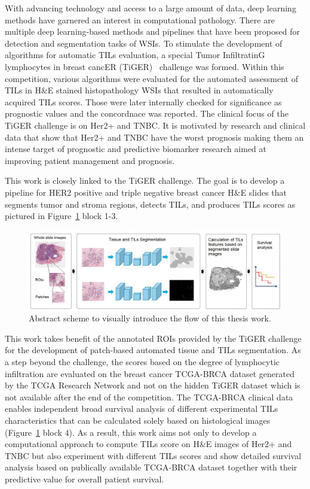 With advancing technology and access to a large amount of data, deep learning
methods have garnered an interest in computational pathology. 
There are multiple deep learning-based methods and pipelines that have been
proposed for detection and segmentation tasks of WSIs. 
To stimulate the development of algorithms for automatic TILs evaluation,
a special Tumor InfiltratinG lymphocytes in breast cancER (TiGER)~\cite{grand}
challenge was formed. Within this competition, various algorithms were
evaluated for the automated assessment of TILs in H\&E stained
histopathology WSIs that resulted in automatically acquired TILs scores.
Those were later internally checked for significance as prognostic values
and the concordnace was reported.
The clinical focus of the TiGER challenge is on Her2+ and TNBC.
It is motivated by research and clinical data that show that Her2+
and TNBC have the worst prognosis making them an intense target of
prognostic and predictive biomarker research aimed at improving patient
management and prognosis.

This work is closely linked to the TiGER challenge. The goal is to develop a pipeline
for HER2 positive and triple negative breast cancer H\&E slides
that segments tumor and stroma regions, detects TILs, and produces TILs scores
as pictured in Figure~\ref*{fig:workflow} block 1-3.
\begin{figure}[H]
    \includegraphics[width=\linewidth]{figures/overview.jpg}
    \caption{Abstract scheme to visually introduce the flow of this thesis work.}
    \label{fig:workflow}
\end{figure}
This work takes benefit of the annotated ROIs provided by the TiGER challenge
for the development of patch-based automated tissue and TILs segmentation.
As a step beyond the challenge, the scores based on the degree of lymphocytic
infiltration are evaluated on the breast cancer TCGA-BRCA dataset generated by
the TCGA Research Network and not on the hidden TiGER dataset which is not available
after the end of the competition.
The TCGA-BRCA clinical data enables independent broad survival analysis of different experimental
TILs characteristics that can be calculated solely based on histological images (Figure~\ref*{fig:workflow} block 4). 
As a result, this work aims not only to develop a computational approach
to compute TILs score on H\&E images of Her2+ and TNBC but also experiment
with different TILs scores and show detailed survival analysis based on publically available
TCGA-BRCA dataset together with their predictive value for overall patient survival. 
